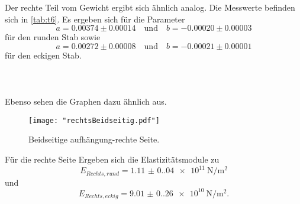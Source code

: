 \noindent Der rechte Teil vom Gewicht ergibt sich ähnlich analog. Die Messwerte
befinden sich in \autoref{tab:t6}. Es ergeben sich für die Parameter 
\begin{equation*}
  a = 0.00374 \pm 0.00014 \quad \text{und} \quad b = -0.00020 \pm 0.00003
\end{equation*}
für den runden Stab sowie
\begin{equation*}
  a = 0.00272 \pm 0.00008 \quad \text{und} \quad b = -0.00021 \pm 0.00001
\end{equation*}
für den eckigen Stab.
\\
\\
\\
\\
\noindent Ebenso sehen die Graphen dazu ähnlich aus.
\begin{figure}[H]
  \centering
  \texttt{[image: "rechtsBeidseitig.pdf"]}
  \caption{Beidseitige aufhängung-rechte Seite.}
  \label{fig:rechtsBeidseitig}
\end{figure}
\noindent Für die rechte Seite Ergeben sich die Elastizitätsmodule zu 
\begin{equation*}
  E_{Rechts,rund} = \qty{1.11(0.04)e11}{\newton\per\meter\squared}
\end{equation*}
und
\begin{equation*}
  E_{Rechts,eckig} = \qty{9.01(0.26)e10}{\newton\per\meter\squared}.
\end{equation*}





